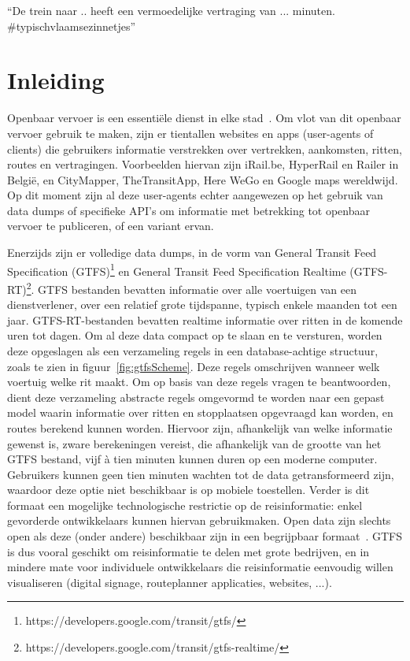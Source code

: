 \begin{savequote}[0.55\linewidth]
	``De trein naar .. heeft een vermoedelijke vertraging van ... minuten. \#typischvlaamsezinnetjes''
\end{savequote}

\chapter{Inleiding}
\label{chap:intro}
Openbaar vervoer is een essentiële dienst in elke stad~\citep{programmableweb14}. Om vlot van dit openbaar vervoer gebruik te maken, zijn er tientallen websites en apps (user-agents of clients) die gebruikers informatie verstrekken over vertrekken, aankomsten, ritten, routes en vertragingen. Voorbeelden hiervan zijn iRail.be, HyperRail en Railer in België, en CityMapper, TheTransitApp, Here WeGo en Google maps wereldwijd. Op dit moment zijn al deze user-agents echter aangewezen op het gebruik van data dumps of specifieke API's om informatie met betrekking tot openbaar vervoer te publiceren, of een variant ervan. 

Enerzijds zijn er volledige data dumps, in de vorm van General Transit Feed Specification (GTFS)\footnote{https://developers.google.com/transit/gtfs/} en General Transit Feed Specification Realtime (GTFS-RT)\footnote{https://developers.google.com/transit/gtfs-realtime/}. GTFS bestanden bevatten informatie over alle voertuigen van een dienstverlener, over een relatief grote tijdspanne, typisch enkele maanden tot een jaar. GTFS-RT-bestanden bevatten realtime informatie over ritten in de komende uren tot dagen. Om al deze data compact op te slaan en te versturen, worden deze opgeslagen als een verzameling regels in een database-achtige structuur, zoals te zien in figuur~\ref{fig:gtfsScheme}. Deze regels omschrijven wanneer welk voertuig welke rit maakt. Om op basis van deze regels vragen te beantwoorden, dient deze verzameling abstracte regels omgevormd te worden naar een gepast model waarin informatie over ritten en stopplaatsen opgevraagd kan worden, en routes berekend kunnen worden. Hiervoor zijn, afhankelijk van welke informatie gewenst is, zware berekeningen vereist, die afhankelijk van de grootte van het GTFS bestand, vijf à tien minuten kunnen duren op een moderne computer. Gebruikers kunnen geen tien minuten wachten tot de data getransformeerd zijn, waardoor deze optie niet beschikbaar is op mobiele toestellen. Verder is dit formaat een mogelijke technologische restrictie op de reisinformatie: enkel gevorderde ontwikkelaars kunnen hiervan gebruikmaken. Open data zijn slechts open als deze (onder andere) beschikbaar zijn in een begrijpbaar formaat~\citep{okfn18}. GTFS is dus vooral geschikt om reisinformatie te delen met grote bedrijven, en in mindere mate voor individuele ontwikkelaars die reisinformatie eenvoudig willen visualiseren (digital signage, routeplanner applicaties, websites, ...).

